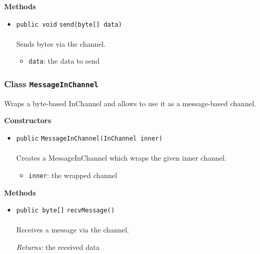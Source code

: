 \textbf{\sffamily Methods}
\begin{itemize}
\item \lstinline|public void| \lstinline|send|\lstinline|(byte[] data)|\\ \\[-0.6em]
Sends bytes via the channel.
\begin{itemize}
\item \lstinline|data|: the data to send
\end{itemize}



\end{itemize}

\subsubsection{Class \lstinline|MessageInChannel|}
Wraps a byte-based InChannel and allows to use it as a message-based
 channel. \\
\noindent\begin{minipage}[t]{5cm}
\vspace{0.3em}
\hspace*{2em}
\vspace{0.3em}
\end{minipage}




\textbf{\sffamily Constructors}
\begin{itemize}
\item \lstinline|public| \lstinline|MessageInChannel|\lstinline|(InChannel inner)|\\ \\[-0.6em]
Creates a MessageInChannel which wraps the given inner channel.
\begin{itemize}
\item \lstinline|inner|: the wrapped channel
\end{itemize}



\end{itemize}


\textbf{\sffamily Methods}
\begin{itemize}
\item \lstinline|public byte[]| \lstinline|recvMessage|\lstinline|()|\\ \\[-0.6em]
Receives a message via the channel.

\emph{Returns:} the received data

\end{itemize}

